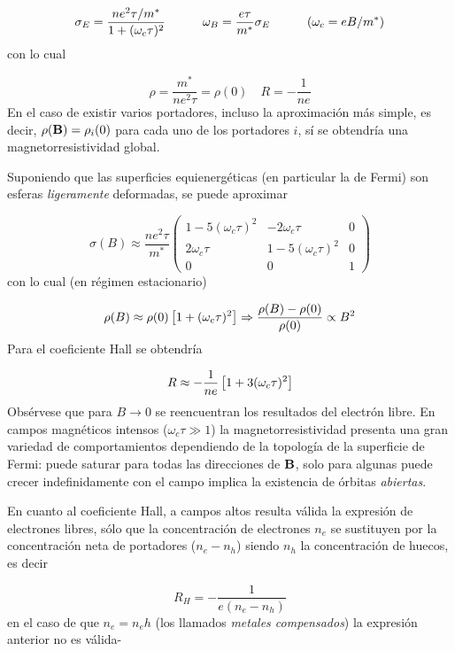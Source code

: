 \begin{equation*}
	\sigma_E = \frac{ne^2 \tau/m^*}{1+(\omega_c\tau)^2} \quad \quad \quad \omega_B = \frac{e\tau}{m^*} \sigma_E  \quad \quad \quad (\omega_c = eB/m^*)
\end{equation*}
con lo cual 

\begin{equation}
	\rho = \frac{m^*}{ne^2\tau} = \rho(0) \quad R=-\frac{1}{ne}
\end{equation}
En el caso de existir varios portadores, incluso la aproximación más simple, es decir, $\rho(\mathbf{B})=\rho_i(0)$ para cada uno de los portadores $i$, sí se obtendría una magnetorresistividad global.

Suponiendo que las superficies equienergéticas (en particular la de Fermi) son esferas \textit{ligeramente} deformadas, se puede aproximar

\begin{equation}
	\sigma (B) \approx \frac{ne^2 \tau}{m^*} \begin{pmatrix}
	1-5 (\omega_c \tau)^2 & -2\omega_c \tau & 0 \\
	2 \omega_c \tau & 1-5(\omega_c \tau)^2 & 0 \\
	0 & 0 & 1
	\end{pmatrix}
\end{equation}
con lo cual (en régimen estacionario)

\begin{equation}
	\rho(B) \approx \rho(0) \left[ 1+(\omega_c \tau)^2 \right] \Rightarrow \frac{\rho(B)-\rho(0)}{\rho(0)} \propto B^2
\end{equation}
Para el coeficiente Hall se obtendría 

\begin{equation}
	R \approx - \frac{1}{ne} \left[ 1+3(\omega_c \tau)^2 \right]
\end{equation}
Obsérvese que para $B\rightarrow 0$ se reencuentran los resultados del electrón libre. En campos magnéticos intensos ($\omega_c \tau \gg 1$) la magnetorresistividad presenta una gran variedad de comportamientos dependiendo de la topología de la superficie de Fermi: puede saturar para todas las direcciones de $\mathbf{B}$, solo para algunas puede crecer indefinidamente con el campo implica la existencia de órbitas \textit{abiertas}.

En cuanto al coeficiente Hall, a campos altos resulta válida la expresión de electrones libres, sólo que la concentración de electrones $n_e$ se sustituyen por la concentración neta de portadores ($n_e-n_h$) siendo $n_h$ la concentración de huecos, es decir

\begin{equation}
	R_H = - \frac{1}{e(n_e-n_h)}
\end{equation}
en el caso de que $n_e=n_eh$ (los llamados \textit{metales compensados}) la expresión anterior no es válida-